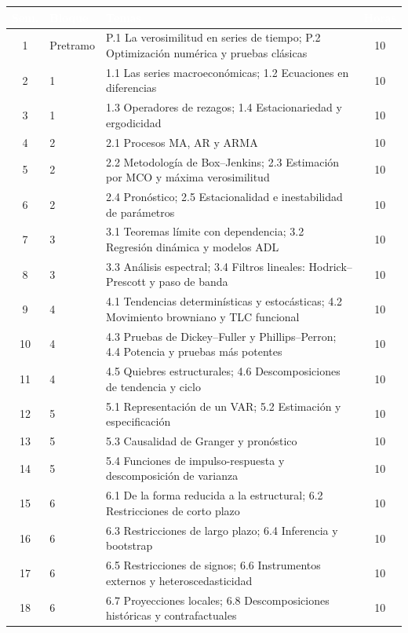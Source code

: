 \documentclass[11pt,a4paper]{article}
\renewcommand{\arraystretch}{1.3}
\newcommand{\cab}[1]{\textcolor{white}{\sffamily\bfseries #1}}
\newcommand{\filasalternas}{\rowcolors{2}{white}{tonoPalido}}
\begin{document}
{\footnotesize\filasalternas
\renewcommand{\arraystretch}{1.1}\noindent\begin{tabularx}{\textwidth}{clXc}
\toprule
\rowcolor{tonoOscuro}\cab{Sem.} & \cab{Bloque} & \cab{Temas} & \cab{Horas} \\
\midrule
1  & Pretramo & P.1 La verosimilitud en series de tiempo; P.2 Optimización numérica y pruebas clásicas & 10 \\
\midrule
2  & 1 & 1.1 Las series macroeconómicas; 1.2 Ecuaciones en diferencias & 10 \\
3  & 1 & 1.3 Operadores de rezagos; 1.4 Estacionariedad y ergodicidad & 10 \\
\midrule
4  & 2 & 2.1 Procesos MA, AR y ARMA & 10 \\
5  & 2 & 2.2 Metodología de Box--Jenkins; 2.3 Estimación por MCO y máxima verosimilitud & 10 \\
6  & 2 & 2.4 Pronóstico; 2.5 Estacionalidad e inestabilidad de parámetros & 10 \\
\midrule
7  & 3 & 3.1 Teoremas límite con dependencia; 3.2 Regresión dinámica y modelos ADL & 10 \\
8  & 3 & 3.3 Análisis espectral; 3.4 Filtros lineales: Hodrick--Prescott y paso de banda & 10 \\
\midrule
9  & 4 & 4.1 Tendencias determinísticas y estocásticas; 4.2 Movimiento browniano y TLC funcional & 10 \\
10 & 4 & 4.3 Pruebas de Dickey--Fuller y Phillips--Perron; 4.4 Potencia y pruebas más potentes & 10 \\
11 & 4 & 4.5 Quiebres estructurales; 4.6 Descomposiciones de tendencia y ciclo & 10 \\
\midrule
12 & 5 & 5.1 Representación de un VAR; 5.2 Estimación y especificación & 10 \\
13 & 5 & 5.3 Causalidad de Granger y pronóstico & 10 \\
14 & 5 & 5.4 Funciones de impulso-respuesta y descomposición de varianza & 10 \\
\midrule
15 & 6 & 6.1 De la forma reducida a la estructural; 6.2 Restricciones de corto plazo & 10 \\
16 & 6 & 6.3 Restricciones de largo plazo; 6.4 Inferencia y bootstrap & 10 \\
17 & 6 & 6.5 Restricciones de signos; 6.6 Instrumentos externos y heteroscedasticidad & 10 \\
18 & 6 & 6.7 Proyecciones locales; 6.8 Descomposiciones históricas y contrafactuales & 10 \\

\end{tabularx}}
\end{document}
